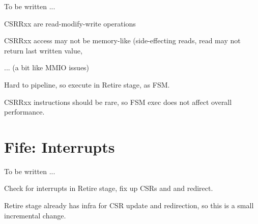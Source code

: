To be written ...

\begin{tightlist}
\item CSRRxx are read-modify-write operations
\item CSRRxx access may not be memory-like (side-effecting reads, read
      may not return last written value,
\item ... (a bit like MMIO issues)
\end{tightlist}
Hard to pipeline, so execute in Retire stage, as FSM.

CSRRxx instructions should be rare, so FSM exec does not affect overall performance.


\section{Fife: Interrupts}

To be written ...

Check for interrupts in Retire stage, fix up CSRs and and redirect.

Retire stage already has infra for CSR update and redirection, so this
is a small incremental change.


